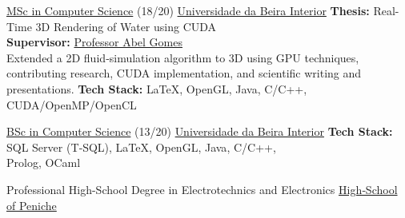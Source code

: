 \documentclass[
	a4paper,
]{fortysecondscv}
\begin{document}
\begin{cvtable}[3]
        {\href{https://www.di.ubi.pt/Cursos/mei/}{MSc in Computer Science} (18/20)}
        {\href{https://www.ubi.pt/}{Universidade da Beira Interior}}
        {
            \textbf{Thesis:} Real-Time 3D Rendering of Water using CUDA\\
            \textbf{Supervisor:} \href{http://www.di.ubi.pt/~agomes/}{Professor Abel Gomes}\\
            Extended a 2D fluid‑simulation algorithm to 3D using GPU techniques, contributing research, CUDA implementation, and scientific writing and presentations.
            \newline \textbf{Tech Stack:}
            {\color{sklimegreen}LaTeX},
            {\color{skyellow}OpenGL},
            {\color{skyellow}Java},
            {\color{skorange}C/C++},
            {\color{skorange}CUDA/OpenMP/OpenCL}
        }

        {\href{https://www.di.ubi.pt/Cursos/lei/}{BSc in Computer Science} (13/20)}
        {\href{https://www.ubi.pt/}{Universidade da Beira Interior}}
        {
            \newline \textbf{Tech Stack:}
            {\color{sklimegreen}SQL Server (T‑SQL)}, 
            {\color{sklimegreen}LaTeX},
            {\color{skyellow}OpenGL},
            {\color{skyellow}Java},
            {\color{skorange}C/C++},\\
            {\color{skorange}Prolog},
            {\color{skorange}OCaml}
        }

        {Professional High-School Degree in Electrotechnics and Electronics}
        {\href{https://site.espeniche.pt/}{High‑School of Peniche}}
        {\vspace{0.5cm}}

\end{cvtable}
\end{document}
